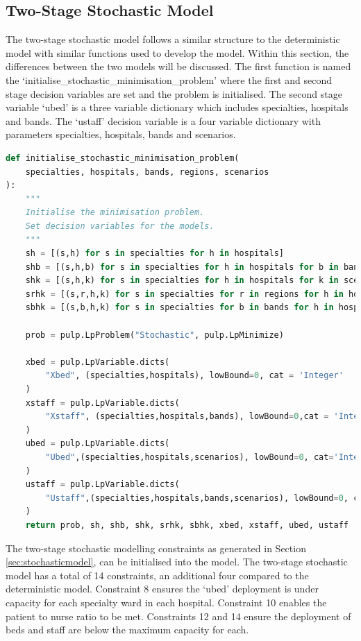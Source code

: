 \documentclass[../thesis.tex]{subfiles}
\begin{document}
\subsection{Two-Stage Stochastic Model}\label{sec:pystochmod}
The two-stage stochastic model follows a similar structure to the deterministic model with similar functions used to develop the model. Within this section, the differences between the two models will be discussed. The first function is named the `initialise\_stochastic\_minimisation\_problem' where the first and second stage decision variables are set and the problem is initialised. The second stage variable `ubed' is a three variable dictionary which includes specialties, hospitals and bands. The `ustaff' decision variable is a four variable dictionary with parameters specialties, hospitals, bands and scenarios.
\begin{lstlisting}[language=python]
def initialise_stochastic_minimisation_problem(
    specialties, hospitals, bands, regions, scenarios
):
    """
    Initialise the minimisation problem.
    Set decision variables for the models.
    """
    sh = [(s,h) for s in specialties for h in hospitals]
    shb = [(s,h,b) for s in specialties for h in hospitals for b in bands]
    shk = [(s,h,k) for s in specialties for h in hospitals for k in scenarios]
    srhk = [(s,r,h,k) for s in specialties for r in regions for h in hospitals for k in scenarios]
    sbhk = [(s,b,h,k) for s in specialties for b in bands for h in hospitals for k in scenarios]
    
    prob = pulp.LpProblem("Stochastic", pulp.LpMinimize)
    
    xbed = pulp.LpVariable.dicts(
        "Xbed", (specialties,hospitals), lowBound=0, cat = 'Integer'
    )
    xstaff = pulp.LpVariable.dicts(
        "Xstaff", (specialties,hospitals,bands), lowBound=0,cat = 'Integer'
    )
    ubed = pulp.LpVariable.dicts(
        "Ubed",(specialties,hospitals,scenarios), lowBound=0, cat='Integer'
    )
    ustaff = pulp.LpVariable.dicts(
        "Ustaff",(specialties,hospitals,bands,scenarios), lowBound=0, cat='Integer'
    )
    return prob, sh, shb, shk, srhk, sbhk, xbed, xstaff, ubed, ustaff
\end{lstlisting}

The two-stage stochastic modelling constraints as generated in Section \ref{sec:stochasticmodel}, can be initialised into the model. The two-stage stochastic model has a total of 14 constraints, an additional four compared to the deterministic model. Constraint 8 ensures the `ubed' deployment is under capacity for each specialty ward in each hospital. Constraint 10 enables the patient to nurse ratio to be met. Constraints 12 and 14 ensure the deployment of beds and staff are below the maximum capacity for each.
\end{document}
